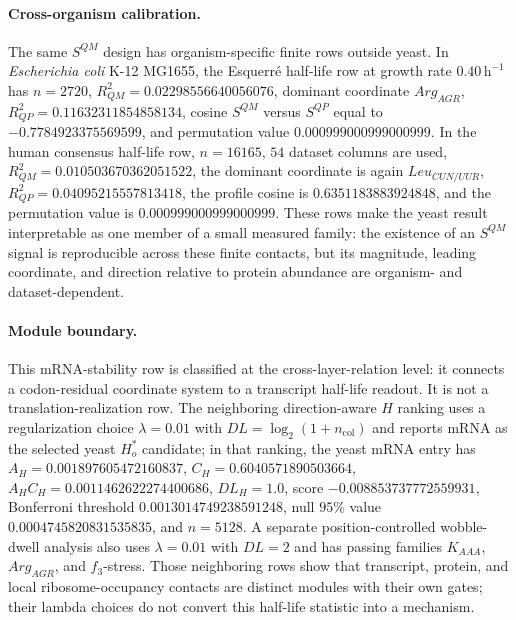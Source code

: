 \paragraph{Cross-organism calibration.}
The same $S^{QM}$ design has organism-specific finite rows outside yeast.  In \textit{Escherichia coli} K-12 MG1655, the Esquerré half-life row at growth rate $0.40\,\mathrm{h}^{-1}$ has $n=2720$, $R^2_{QM}=0.02298556640056076$, dominant coordinate $Arg_{AGR}$, $R^2_{QP}=0.11632311854858134$, cosine $S^{QM}$ versus $S^{QP}$ equal to $-0.7784923375569599$, and permutation value $0.000999000999000999$.  In the human consensus half-life row, $n=16165$, $54$ dataset columns are used, $R^2_{QM}=0.010503670362051522$, the dominant coordinate is again $Leu_{CUN/UUR}$, $R^2_{QP}=0.04095215557813418$, the profile cosine is $0.6351183883924848$, and the permutation value is $0.000999000999000999$.  These rows make the yeast result interpretable as one member of a small measured family: the existence of an $S^{QM}$ signal is reproducible across these finite contacts, but its magnitude, leading coordinate, and direction relative to protein abundance are organism- and dataset-dependent.

\paragraph{Module boundary.}
This mRNA-stability row is classified at the cross-layer-relation level: it connects a codon-residual coordinate system to a transcript half-life readout.  It is not a translation-realization row.  The neighboring direction-aware $H$ ranking uses a regularization choice $\lambda=0.01$ with $DL=\log_2(1+n_{\mathrm{col}})$ and reports mRNA as the selected yeast $H_o^{\ast}$ candidate; in that ranking, the yeast mRNA entry has $A_H=0.001897605472160837$, $C_H=0.6040571890503664$, $A_H C_H=0.0011462622274400686$, $DL_H=1.0$, score $-0.008853737772559931$, Bonferroni threshold $0.0013014749238591248$, null $95\%$ value $0.0004745820831535835$, and $n=5128$.  A separate position-controlled wobble-dwell analysis also uses $\lambda=0.01$ with $DL=2$ and has passing families $K_{AAA}$, $Arg_{AGR}$, and $f_3$-stress.  Those neighboring rows show that transcript, protein, and local ribosome-occupancy contacts are distinct modules with their own gates; their lambda choices do not convert this half-life statistic into a mechanism.

